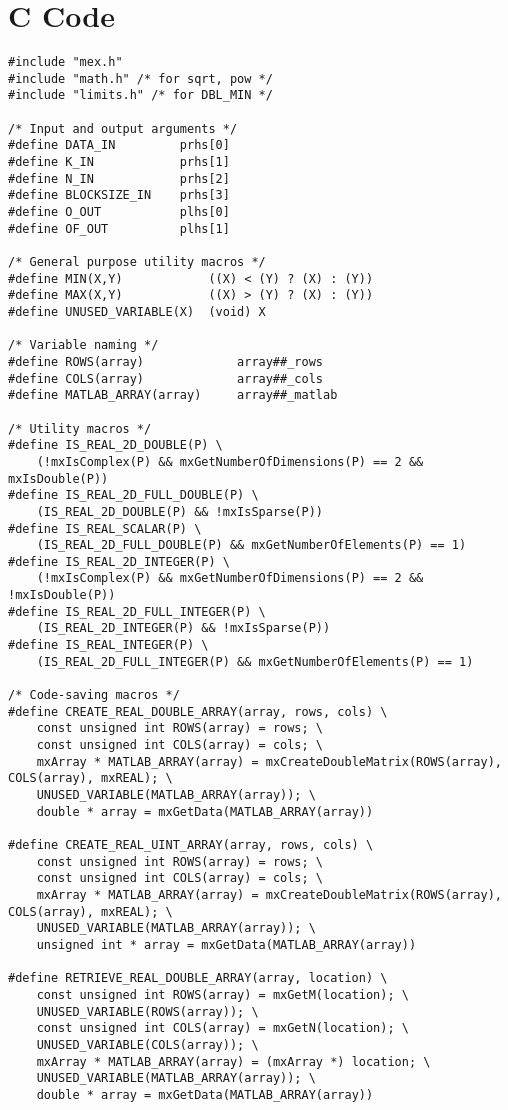 \chapter{C Code}
\label{apdx:cCode}
\lstset{language=C}
\begin{lstlisting}
#include "mex.h"
#include "math.h" /* for sqrt, pow */
#include "limits.h" /* for DBL_MIN */

/* Input and output arguments */
#define DATA_IN         prhs[0]
#define K_IN            prhs[1]
#define N_IN            prhs[2]
#define BLOCKSIZE_IN    prhs[3]
#define O_OUT           plhs[0]
#define OF_OUT          plhs[1]

/* General purpose utility macros */
#define MIN(X,Y) 			((X) < (Y) ? (X) : (Y))
#define MAX(X,Y) 			((X) > (Y) ? (X) : (Y))
#define UNUSED_VARIABLE(X)	(void) X

/* Variable naming */
#define ROWS(array)				array##_rows
#define COLS(array) 			array##_cols
#define MATLAB_ARRAY(array)		array##_matlab

/* Utility macros */
#define IS_REAL_2D_DOUBLE(P) \
	(!mxIsComplex(P) && mxGetNumberOfDimensions(P) == 2 && mxIsDouble(P))
#define IS_REAL_2D_FULL_DOUBLE(P) \
	(IS_REAL_2D_DOUBLE(P) && !mxIsSparse(P))
#define IS_REAL_SCALAR(P) \
	(IS_REAL_2D_FULL_DOUBLE(P) && mxGetNumberOfElements(P) == 1)
#define IS_REAL_2D_INTEGER(P) \
	(!mxIsComplex(P) && mxGetNumberOfDimensions(P) == 2 && !mxIsDouble(P))
#define IS_REAL_2D_FULL_INTEGER(P) \
	(IS_REAL_2D_INTEGER(P) && !mxIsSparse(P))
#define IS_REAL_INTEGER(P) \
	(IS_REAL_2D_FULL_INTEGER(P) && mxGetNumberOfElements(P) == 1)

/* Code-saving macros */
#define CREATE_REAL_DOUBLE_ARRAY(array, rows, cols) \
	const unsigned int ROWS(array) = rows; \
	const unsigned int COLS(array) = cols; \
	mxArray * MATLAB_ARRAY(array) = mxCreateDoubleMatrix(ROWS(array), COLS(array), mxREAL); \
	UNUSED_VARIABLE(MATLAB_ARRAY(array)); \
	double * array = mxGetData(MATLAB_ARRAY(array))
	
#define CREATE_REAL_UINT_ARRAY(array, rows, cols) \
	const unsigned int ROWS(array) = rows; \
	const unsigned int COLS(array) = cols; \
	mxArray * MATLAB_ARRAY(array) = mxCreateDoubleMatrix(ROWS(array), COLS(array), mxREAL); \
	UNUSED_VARIABLE(MATLAB_ARRAY(array)); \
	unsigned int * array = mxGetData(MATLAB_ARRAY(array))
	
#define RETRIEVE_REAL_DOUBLE_ARRAY(array, location) \
	const unsigned int ROWS(array) = mxGetM(location); \
	UNUSED_VARIABLE(ROWS(array)); \
	const unsigned int COLS(array) = mxGetN(location); \
	UNUSED_VARIABLE(COLS(array)); \
	mxArray * MATLAB_ARRAY(array) = (mxArray *) location; \
	UNUSED_VARIABLE(MATLAB_ARRAY(array)); \
	double * array = mxGetData(MATLAB_ARRAY(array))
	

\end{lstlisting}
